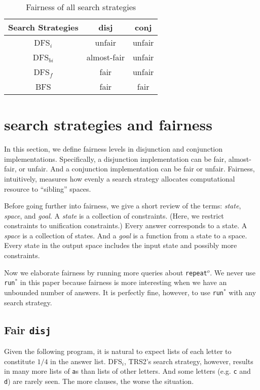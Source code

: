 \documentclass[acmlarge, review=true]{acmart}
\newcommand{\conj}{\texttt{conj}}
\newcommand{\disj}{\texttt{disj}}
\newcommand{\repeato}{\texttt{repeat$^o$}}
\newcommand{\runstar}{\texttt{run$^*$}}
\newcommand{\DFSi }[0]{DFS$_{i}$}
\newcommand{\DFSf }[0]{DFS$_{f}$}
\newcommand{\DFSbi}[0]{DFS$_{bi}$}
\newcommand{\BFS}[0]{BFS}
\begin{document}
\begin{table}[h]
	\begin{tabular}{|c|c|c|}
		\hline 
		Search Strategies & disj & conj \\ 
		\hline 
		\DFSi & unfair & unfair \\ 
		\hline 
		\DFSbi & almost-fair & unfair \\ 
		\hline 
		\DFSf & fair & unfair \\ 
		\hline 
		\BFS & fair & fair \\ 
		\hline 
	\end{tabular} 
	\caption{Fairness of all search strategies}
	\label{table-fairness}
\end{table}

\section{search strategies and fairness}

In this section, we define fairness levels in disjunction and conjunction
implementations. Specifically, a disjunction implementation can be
fair, almost-fair, or unfair. And a conjunction implementation can be
fair or unfair. Fairness, intuitively, measures how evenly a search strategy 
allocates computational resource to ``sibling'' spaces.

Before going further into fairness, we give a short review of the terms:
\emph{state}, \emph{space}, and \emph{goal}.
A \emph{state} is a collection of constraints. (Here, we restrict 
constraints to unification constraints.) Every answer corresponds to a 
state. A \emph{space} is a collection of states. And a \emph{goal} is a 
function from a state to a space.
Every state in the output space includes the input state and possibly more 
constraints.

Now we elaborate fairness by running more queries about \repeato{}. We never 
use \runstar{} in this paper because fairness is more interesting when we 
have an unbounded number of answers. It is perfectly fine, however, to use 
\runstar{} with any search strategy.

\subsection{Fair \texttt{disj}}

Given the following program, it is natural to expect lists of each
letter to constitute $1/4$ in the answer list. \DFSi, TRS2's search
strategy, however, results in many more lists of \texttt{a}s than
lists of other letters. And some letters (e.g. \texttt{c} and
\texttt{d}) are rarely seen. The more clauses, the worse the situation.
\end{document}
